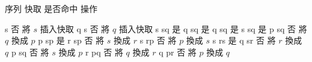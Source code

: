 
\bTABLE[
    align={middle,lohi},
    split=yes,
    header=repeat,
    offset=.25em,
]

\setupTABLE[column][1][leftframe=off]
\setupTABLE[column][-1][rightframe=off]
\setupTABLE[row][each][topframe=off,bottomframe=off]
\setupTABLE[header][each][bottomframe=on,foregroundstyle=bold]

\bTABLEhead
\bTR \bTH 序列 \eTH\bTH 快取 \eTH\bTH 是否命中 \eTH\bTH 操作 \eTH \eTR
\eTABLEhead

\bTABLEbody
\bTR \bTD s \eTD\bTD  \eTD\bTD 否 \eTD\bTD 將 $s$ 插入快取 \eTD \eTR
\bTR \bTD q \eTD\bTD s \eTD\bTD 否 \eTD\bTD 將 $q$ 插入快取 \eTD \eTR
\bTR \bTD s \eTD\bTD sq \eTD\bTD 是 \eTD\bTD \eTD \eTR
\bTR \bTD q \eTD\bTD sq \eTD\bTD 是 \eTD\bTD \eTD \eTR
\bTR \bTD q \eTD\bTD sq \eTD\bTD 是 \eTD\bTD \eTD \eTR
\bTR \bTD s \eTD\bTD sq \eTD\bTD 是 \eTD\bTD \eTD \eTR
\bTR \bTD p \eTD\bTD sq \eTD\bTD 否 \eTD\bTD 將 $q$ 換成 $p$ \eTD \eTR
\bTR \bTD p \eTD\bTD sp \eTD\bTD 是 \eTD\bTD \eTD \eTR
\bTR \bTD r \eTD\bTD sp \eTD\bTD 否 \eTD\bTD 將 $s$ 換成 $r$ \eTD \eTR
\bTR \bTD s \eTD\bTD rp \eTD\bTD 否 \eTD\bTD 將 $p$ 換成 $s$ \eTD \eTR
\bTR \bTD s \eTD\bTD rs \eTD\bTD 是 \eTD\bTD \eTD \eTR
\bTR \bTD q \eTD\bTD sr \eTD\bTD 否 \eTD\bTD 將 $r$ 換成 $q$ \eTD \eTR
\bTR \bTD p \eTD\bTD sq \eTD\bTD 否 \eTD\bTD 將 $s$ 換成 $p$ \eTD \eTR
\bTR \bTD r \eTD\bTD pq \eTD\bTD 否 \eTD\bTD 將 $q$ 換成 $r$ \eTD \eTR
\bTR \bTD q \eTD\bTD pr \eTD\bTD 否 \eTD\bTD 將 $p$ 換成 $q$ \eTD \eTR
\eTABLEbody

\eTABLE
